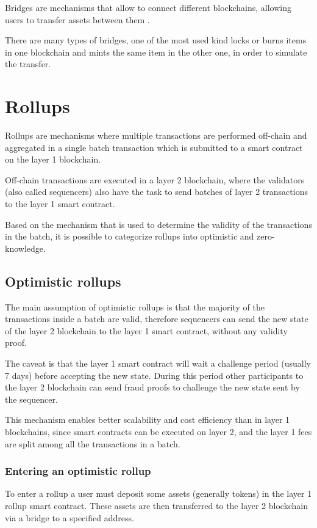 \documentclass[12pt]{article}
\begin{document}
Bridges are mechanisms that allow to connect different blockchains, allowing users to transfer assets between them \cite{ethereum_bridges}.

There are many types of bridges, one of the most used kind locks or burns items in one blockchain and mints the same item in the other one, in order to simulate the transfer.

\section{Rollups} \label{section:rollups}
Rollups are mechanisms where multiple transactions are performed off-chain and aggregated in a single batch transaction which is submitted to a smart contract on the layer 1 blockchain.

Off-chain transactions are executed in a layer 2 blockchain, where the validators (also called sequencers) also have the task to send batches of layer 2 transactions to the layer 1 smart contract.

Based on the mechanism that is used to determine the validity of the transactions in the batch, it is possible to categorize rollups into optimistic and zero-knowledge.

\subsection{Optimistic rollups} \label{subsection:optimistic_rollups}
The main assumption of optimistic rollups is that the majority of the transactions inside a batch are valid, therefore sequencers can send the new state of the layer 2 blockchain to the layer 1 smart contract, without any validity proof.

The caveat is that the layer 1 smart contract will wait a challenge period (usually 7 days) before accepting the new state. 
During this period other participants to the layer 2 blockchain can send fraud proofs to challenge the new state sent by the sequencer.

This mechanism enables better scalability and cost efficiency than in layer 1 blockchains, since smart contracts can be executed on layer 2, and the layer 1 fees are split among all the transactions in a batch.

\subsubsection{Entering an optimistic rollup} \label{subsubsection:entering_optimistic_rollup}
To enter a rollup a user must deposit some assets (generally tokens) in the layer 1 rollup smart contract. These assets are then transferred to the layer 2 blockchain via a bridge to a specified address.
\end{document}
